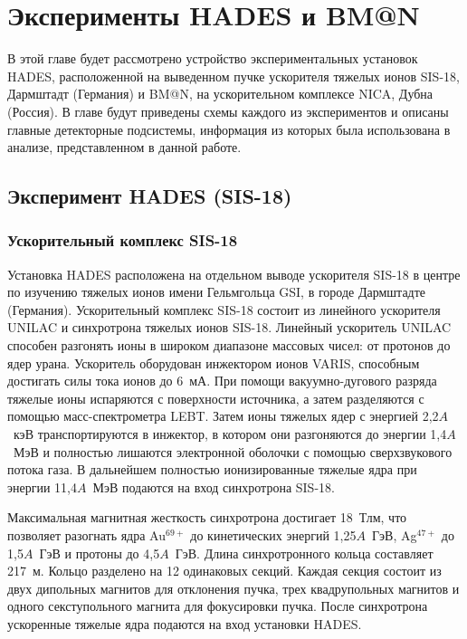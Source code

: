 \chapter{Эксперименты HADES и BM@N} \label{chapt2}

В этой главе будет рассмотрено устройство экспериментальных установок HADES, расположенной на выведенном пучке ускорителя тяжелых ионов SIS-18, Дармштадт (Германия) и BM@N, на ускорительном комплексе NICA, Дубна (Россия).
В главе будут приведены схемы каждого из экспериментов и описаны главные  детекторные подсистемы, информация из которых была использована в анализе, представленном в данной работе.

\section{Эксперимент HADES (SIS-18)}

\subsection{Ускорительный комплекс SIS-18}

Установка HADES расположена на отдельном выводе ускорителя SIS-18 в центре по изучению тяжелых ионов имени Гельмгольца GSI, в городе Дармштадте (Германия).
Ускорительный комплекс SIS-18 состоит из линейного ускорителя UNILAC и синхротрона тяжелых ионов SIS-18.
Линейный ускоритель UNILAC способен разгонять ионы в широком диапазоне массовых чисел: от протонов до ядер урана.
Ускоритель оборудован инжектором ионов VARIS, способным достигать силы тока ионов до 6~мА.
При помощи вакуумно-дугового разряда тяжелые ионы испаряются с поверхности источника, а затем разделяются с помощью масс-спектрометра LEBT.
Затем ионы тяжелых ядер с энергией 2,2$A$~кэВ транспортируются в инжектор, в котором они разгоняются до энергии 1,4$A$~МэВ и полностью лишаются электронной оболочки с помощью сверхзвукового потока газа.
В дальнейшем полностью ионизированные тяжелые ядра при энергии 11,4$A$~МэВ подаются на вход синхротрона SIS-18.

Максимальная магнитная жесткость синхротрона достигает 18~Тл\boldsymbol{\cdot}м, что позволяет разогнать ядра Au$^{69+}$ до кинетических энергий 1,25$A$~ГэВ, Ag$^{47+}$ до 1,5$A$~ГэВ и протоны до 4,5$A$~ГэВ.
Длина синхротронного кольца составляет 217~м.
Кольцо разделено на 12 одинаковых секций.
Каждая секция состоит из двух дипольных магнитов для отклонения пучка, трех квадрупольных магнитов и одного секступольного магнита для фокусировки пучка.
После синхротрона ускоренные тяжелые ядра подаются на вход установки HADES.

